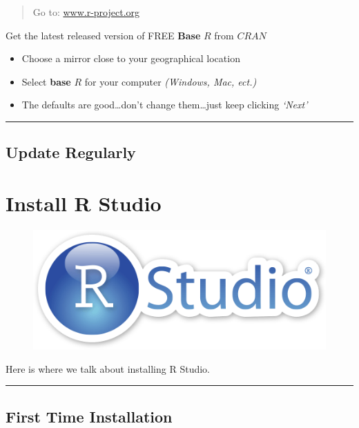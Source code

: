 \documentclass[]{book}
\providecommand{\tightlist}{%
  \setlength{\itemsep}{0pt}\setlength{\parskip}{0pt}}
\theoremstyle{definition}
\theoremstyle{definition}
\theoremstyle{definition}
\theoremstyle{remark}
\begin{document}
\begin{quote}
Go to: \href{http://www.r-project.org}{www.r-project.org}
\end{quote}

Get the latest released version of FREE \textbf{Base} \(R\) from
\(CRAN\)

\begin{itemize}
\tightlist
\item
  Choose a mirror close to your geographical location
\item
  Select \textbf{base} \(R\) for your computer \emph{(Windows, Mac,
  ect.)}
\item
  The defaults are good\ldots{}don't change them\ldots{}just keep
  clicking \emph{`Next'}
\end{itemize}

\begin{center}\rule{0.5\linewidth}{\linethickness}\end{center}

\section{Update Regularly}\label{update-regularly}

\chapter{Install R Studio}\label{install-r-studio}

\begin{figure}
\centering
\includegraphics{img/rstudiosticker.png}
\caption{}
\end{figure}

Here is where we talk about installing R Studio.

\begin{center}\rule{0.5\linewidth}{\linethickness}\end{center}

\section{First Time Installation}\label{first-time-installation-1}
\end{document}
